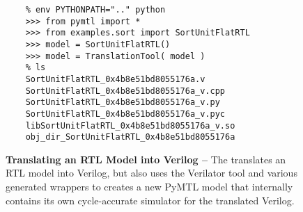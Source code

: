 
\begin{figure}

\begin{minipage}[t]{0.5\tw}
  \begin{lstlisting}[gobble=4]
    % cd ${TUTROOT}/build
    % env PYTHONPATH=".." python
    >>> from pymtl import *
    >>> from examples.sort import SortUnitFlatRTL
    >>> model = SortUnitFlatRTL()
    >>> model = TranslationTool( model )
    % ls
    SortUnitFlatRTL_0x4b8e51bd8055176a.v
    SortUnitFlatRTL_0x4b8e51bd8055176a_v.cpp
    SortUnitFlatRTL_0x4b8e51bd8055176a_v.py
    SortUnitFlatRTL_0x4b8e51bd8055176a_v.pyc
    libSortUnitFlatRTL_0x4b8e51bd8055176a_v.so
    obj_dir_SortUnitFlatRTL_0x4b8e51bd8055176a
\end{lstlisting}
\end{minipage}
\hfill
\begin{minipage}[t]{0.47\tw}
  \caption{\textbf{Translating an RTL Model into Verilog --} The
     translates an RTL model into Verilog, but also
    uses the Verilator tool and various generated wrappers to creates a
    new PyMTL model that internally contains its own cycle-accurate
    simulator for the translated Verilog.}
  \label{code-tut3-sort-translate}
\end{minipage}

\end{figure}

